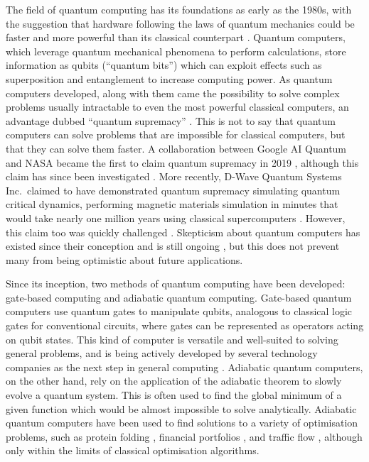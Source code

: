 \documentclass[12pt]{article}
\theoremstyle{definition}
\begin{document}
The field of quantum computing has its foundations as early as the 1980s, with the suggestion that hardware following the laws of quantum mechanics could be faster and more powerful than its classical counterpart \cite{feynman_simulating_1982}.
Quantum computers, which leverage quantum mechanical phenomena to perform calculations, store information as qubits (``quantum bits'') which can exploit effects such as superposition and entanglement to increase computing power.
As quantum computers developed, along with them came the possibility to solve complex problems usually intractable to even the most powerful classical computers, an advantage dubbed ``quantum supremacy'' \cite{preskill_supremacy_2012}. This is not to say that quantum computers can solve problems that are impossible for classical computers, but that they can solve them faster. A collaboration between Google AI Quantum and NASA became the first to claim quantum supremacy in 2019 \cite{arute_quantum_2019}, although this claim has since been investigated \cites{pednault_leveraging_2019}{mccormick_race_2022}. More recently, D-Wave Quantum Systems Inc.\ claimed to have demonstrated quantum supremacy simulating quantum critical dynamics, performing magnetic materials simulation in minutes that would take nearly one million years using classical supercomputers \cite{king_beyond_2025}. However, this claim too was quickly challenged \cites{tindall_dynamics_2025}{mauron_challenging_2025}. Skepticism about quantum computers has existed since their conception \cite{unruh_maintaining_1995} and is still ongoing \cite{brooks_quantum_2023}, but this does not prevent many from being optimistic about future applications.

Since its inception, two methods of quantum computing have been developed: gate-based computing and adiabatic quantum computing.
Gate-based quantum computers use quantum gates to manipulate qubits, analogous to classical logic gates for conventional circuits, where gates can be represented as operators acting on qubit states. This kind of computer is versatile and well-suited to solving general problems, and is being actively developed by several technology companies as the next step in general computing \cites{google}{ibm}.
Adiabatic quantum computers, on the other hand, rely on the application of the adiabatic theorem to slowly evolve a quantum system. This is often used to find the global minimum of a given function which would be almost impossible to solve analytically. Adiabatic quantum computers have been used to find solutions to a variety of optimisation problems, such as protein folding \cite{perdomo-ortiz_protein_2012}, financial portfolios \cite{phillipson_portfolio_2021}, and traffic flow \cite{inoue_traffic_2021}, although only within the limits of classical optimisation algorithms.
\end{document}
